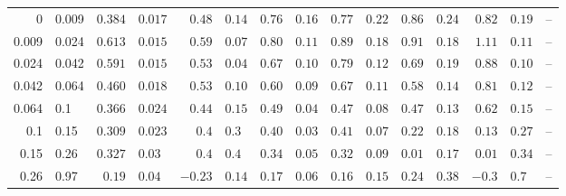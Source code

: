 \begin{table*}
\begin{centering}
{\begin{tabular}{r@{ -- }l r@{$\pm$}l r@{$\pm$}l r@{$\pm$}l r@{$\pm$}l r@{$\pm$}l r@{$\pm$}l r@{$\pm$}l}
    
    0 & 0.009         & $0.384$ & $0.017$ & $0.48$ & $0.14$ & $0.76$ & $0.16$ & $0.77$ & $0.22$ & $0.86$ & $0.24$ & $0.82$ & $0.19$ & \multicolumn{2}{c}{--} \\
    0.009 & 0.024 & $0.613$ & $0.015$ & $0.59$ & $0.07$ & $0.80$ & $0.11$ & $0.89$ & $0.18$ & $0.91$ & $0.18$ & $1.11$ & $0.11$ & \multicolumn{2}{c}{--} \\
    0.024 & 0.042 & $0.591$ & $0.015$ & $0.53$ & $0.04$ & $0.67$ & $0.10$ & $0.79$ & $0.12$ & $0.69$ & $0.19$ & $0.88$ & $0.10$ & \multicolumn{2}{c}{--} \\
    0.042 & 0.064 & $0.460$ & $0.018$ & $0.53$ & $0.10$ & $0.60$ & $0.09$ & $0.67$ & $0.11$ & $0.58$ & $0.14$ & $0.81$ & $0.12$ & \multicolumn{2}{c}{--} \\
    0.064 & 0.1     & $0.366$ & $0.024$ & $0.44$ & $0.15$ & $0.49$ & $0.04$ & $0.47$ & $0.08$ & $0.47$ & $0.13$ & $0.62$ & $0.15$ & \multicolumn{2}{c}{--} \\
    0.1 & 0.15       & $0.309$ & $0.023$ & $0.4$ & $0.3$ & $0.40$ & $0.03$ & $0.41$ & $0.07$ & $0.22$ & $0.18$ & $0.13$ & $0.27$ & \multicolumn{2}{c}{--} \\
    0.15 & 0.26     & $0.327$ & $0.03$ & $0.4$ & $0.4$ & $0.34$ & $0.05$ & $0.32$ & $0.09$ & $0.01$ & $0.17$ & $0.01$ & $0.34$ & \multicolumn{2}{c}{--} \\
    0.26 & 0.97      & $0.19$ & $0.04$ & $-0.23$ & $0.14$ & $0.17$ & $0.06$ & $0.16$ & $0.15$ & $0.24$ & $0.38$ & $-0.3$ & $0.7$ & \multicolumn{2}{c}{--} \\
    
    
    \end{tabular}}
    \par\end{centering}
    \end{table*}